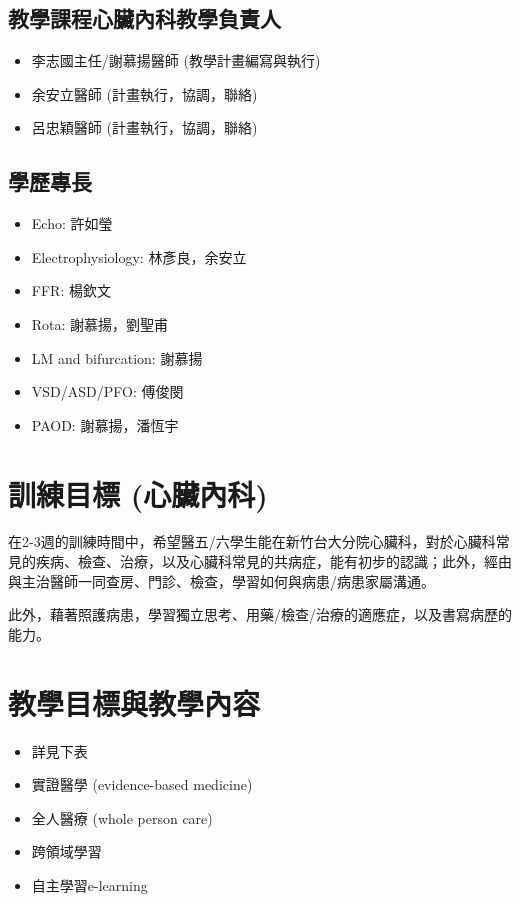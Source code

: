 \documentclass[12pt,a4paper]{article}
\begin{document}
\subsection{教學課程心臟內科教學負責人}
\begin{itemize}
    \item 李志國主任/謝慕揚醫師 (教學計畫編寫與執行)
    \item 余安立醫師 (計畫執行，協調，聯絡)
    \item 呂忠穎醫師 (計畫執行，協調，聯絡)
\end{itemize}

\subsection{學歷專長}
\begin{itemize}
    \item Echo: 許如瑩
    \item Electrophysiology: 林彥良，余安立
    \item FFR: 楊欽文
    \item Rota: 謝慕揚，劉聖甫
    \item LM and bifurcation: 謝慕揚
    \item VSD/ASD/PFO: 傅俊閔
    \item PAOD: 謝慕揚，潘恆宇
\end{itemize}

\section{訓練目標 (心臟內科)}
在2-3週的訓練時間中，希望醫五/六學生能在新竹台大分院心臟科，對於心臟科常見的疾病、檢查、治療，以及心臟科常見的共病症，能有初步的認識；此外，經由與主治醫師一同查房、門診、檢查，學習如何與病患/病患家屬溝通。

此外，藉著照護病患，學習獨立思考、用藥/檢查/治療的適應症，以及書寫病歷的能力。

\section{教學目標與教學內容}
\begin{itemize}
    \item 詳見下表
    \item 實證醫學 (evidence-based medicine)
    \item 全人醫療 (whole person care)
    \item 跨領域學習
    \item 自主學習e-learning
\end{itemize}
\end{document}
